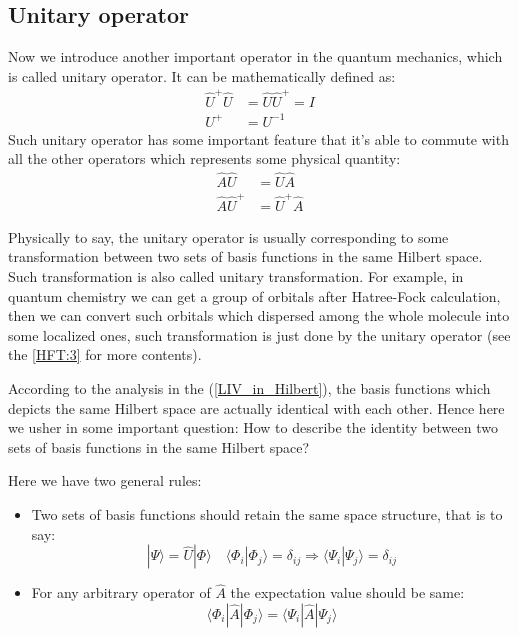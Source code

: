 \subsection{Unitary operator}\label{OPERATOR:2}
%
%
%
Now we introduce another important operator in the quantum
mechanics, which is called unitary operator. It can be
mathematically defined as:
\begin{align}\label{OPERATOReq:10}
\hat{U}^{+}\hat{U} &= \hat{U}\hat{U}^{+}= I \nonumber \\
U^{+}  &= U^{-1}
\end{align}
Such unitary operator has some important feature that it's able to
commute with all the other operators which represents some physical
quantity:
\begin{align}\label{OPERATOReq:14}
\hat{A}\hat{U} &= \hat{U}\hat{A} \nonumber \\
\hat{A}\hat{U}^{+} &= \hat{U}^{+}\hat{A}
\end{align}

Physically to say, the unitary operator is usually corresponding to
some transformation between two sets of basis functions in the same
Hilbert space. Such transformation is also called unitary
transformation. For example, in quantum chemistry we can get a group
of orbitals after Hatree-Fock calculation, then we can convert such
orbitals which dispersed among the whole molecule into some
localized ones, such transformation is just done by the unitary
operator (see the \ref{HFT:3} for more contents).

According to the analysis in the (\ref{LIV_in_Hilbert}), the basis
functions which depicts the same Hilbert space are actually
identical with each other. Hence here we usher in some important
question: How to describe the identity between two sets of basis
functions in the same Hilbert space?

Here we have two general rules:
\begin{itemize}\label{OPERATOReq:13}
  \item Two sets of basis functions should retain the same
  space structure, that is to say:
  \begin{equation}\label{}
|\Psi\rangle = \hat{U}|\Phi\rangle \quad
\langle\Phi_{i}|\Phi_{j}\rangle = \delta_{ij} \Rightarrow
\langle\Psi_{i}|\Psi_{j}\rangle = \delta_{ij}
  \end{equation}
  \item For any arbitrary operator of $\hat{A}$ the
  expectation value should be same:
\begin{equation}
\langle\Phi_{i}|\hat{A}|\Phi_{j}\rangle =
\langle\Psi_{i}|\hat{A}|\Psi_{j}\rangle
\end{equation}
\end{itemize}

